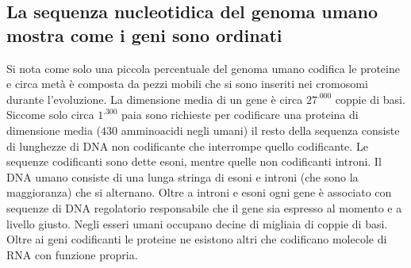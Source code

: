 \subsection{La sequenza nucleotidica del genoma umano mostra come i geni sono ordinati}
Si nota come solo una piccola percentuale del genoma umano codifica le proteine e circa met\`a \`e composta da pezzi mobili che si sono inseriti nei cromosomi durante l'evoluzione. La
dimensione media di un gene \`e circa $27^.000$ coppie di basi. Siccome solo circa $1^.300$ paia sono richieste per codificare una proteina di dimensione media ($430$ amminoacidi negli 
umani) il resto della sequenza consiste di lunghezze di DNA non codificante che interrompe quello codificante. Le sequenze codificanti sono dette esoni, mentre quelle non codificanti
introni. Il DNA umano consiste di una lunga stringa di esoni e introni (che sono la maggioranza) che si alternano. Oltre a introni e esoni ogni gene \`e associato con sequenze di DNA
regolatorio responsabile che il gene sia espresso al momento e a livello giusto. Negli esseri umani occupano decine di migliaia di coppie di basi. Oltre ai geni codificanti le proteine
ne esistono altri che codificano molecole di RNA con funzione propria.
